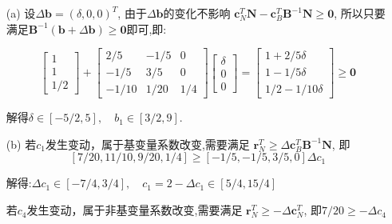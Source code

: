 \documentclass[UTF8]{ctexart}
\begin{document}
\begin{enumerate}
          \begin{enumerate}
              \item[(a)] 设$\Delta\bm{b}=(\delta,0,0)^T$,
                    由于$\Delta\bm{b}$的变化不影响
                    $\bm{c}^T_{N}\bm{N}-\bm{c}^T_B\bm{B}^{-1}\bm{N}\geq\bm{0}$,
                    所以只要满足$\bm{B}^{-1}(\bm{b}+\Delta \bm{b})\geq \bm{0}$即可,即:

                    \[
                        \begin{bmatrix}
                            1 \\
                            1 \\
                            1/2
                        \end{bmatrix}+
                        \begin{bmatrix}
                            2/5   & -1/5 & 0   \\
                            -1/5  & 3/5  & 0   \\
                            -1/10 & 1/20 & 1/4
                        \end{bmatrix}
                        \begin{bmatrix}
                            \delta \\
                            0      \\
                            0
                        \end{bmatrix}=
                        \begin{bmatrix}
                            1+2/5\delta \\
                            1-1/5\delta \\
                            1/2-1/10\delta
                        \end{bmatrix}
                        \geq \bm{0}
                    \]

                    解得$\delta \in [-5/2,5],\quad b_1\in [3/2,9]$.

              \item[(b)] 若$c_1$发生变动，属于基变量系数改变,需要满足
                    $\bm{r}^T_N \geq \Delta\bm{c}^T_B\bm{B}^{-1}\bm{N}$,
                    即
                    \[[7/20,11/10,9/20,1/4] \geq [−1/5,−1/5,3/5,0 ]\Delta c_1\]

                    解得:$\Delta c_1 \in [-7/4,3/4],\quad c_1=2-\Delta c_1 \in [5/4,15/4]$


                    若$c_4$发生变动，属于非基变量系数改变,需要满足
                    $\bm{r}^T_N \geq -\Delta\bm{c}^T_N$,
                    即$7/20\geq -\Delta c_4$


\end{enumerate}
\end{enumerate}
\end{document}
